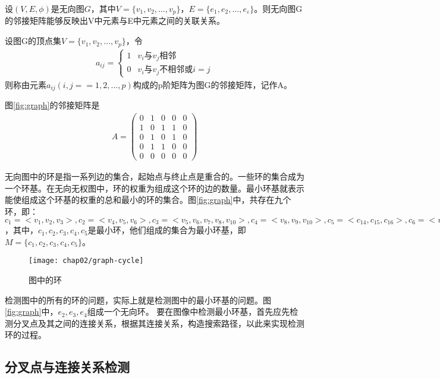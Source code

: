设$(V, E, \phi)$是无向图$G$，其中$V = \{v_1, v_2, \ldots, v_p\}$，$E = \{e_1, e_2, \ldots, e_\varepsilon\}$。则无向图G的邻接矩阵能够反映出V中元素与E中元素之间的关联关系。
\begin{definition}
设图G的顶点集$V = \{v_1, v_2, \ldots, v_p\}$，令
\begin{align}
a_{ij} = \left\{ \begin{array}{ll}
1 & \textrm{$v_i$与$v_j$相邻}\\
0 & \textrm{$v_i$与$v_j$不相邻或$i = j$}
\end{array} \right.
\end{align}
则称由元素$a_{ij} (i, j == 1, 2, \ldots, p)$构成的p阶矩阵为图G的邻接矩阵\cite{wangzhaorui}，记作A。
\end{definition}
图\ref{fig:graph}的邻接矩阵是
\begin{align}
A = \left( \begin{array}{lllll}
0 & 1 & 0 & 0 & 0 \\
1 & 0 & 1 & 1 & 0 \\
0 & 1 & 0 & 1 & 0 \\
0 & 1 & 1 & 0 & 0 \\
0 & 0 & 0 & 0 & 0 
\end{array} \right)
\end{align}

无向图中的环是指一系列边的集合，起始点与终止点是重合的。一些环的集合成为一个环基。在无向无权图中，环的权重为组成这个环的边的数量。最小环基就表示能使组成这个环基的权重的总和最小的环的集合。图\ref{fig:graph}中，共存在九个环，即：$c_1 = < v_1, v_2, v_3>, c_2 = <v_4, v_5, v_6>, c_3 = <v_5, v_6, v_7, v_8, v_{10}>, c_4 = <v_8, v_9, v_{10}>, c_5 = < c_{14}, c_{15}, c_{16}>, c_6 = <v_{10}, v_{11}, v_{12}, v_{13}>, c_7 = <c_4, c_5, v_{10}, v_9, v_8, v_7, v_6>, c_8 = < v_6, v_5, v_{10}, v_9, v_8, v_7>, v_9 = < v_4, v_5, v_{10}, v_9, v_8, v_7, v_6>$，其中，$c_1, c_2, c_3, c_4, c_5$是最小环，他们组成的集合为最小环基，即$M = \{c_1, c_2, c_3, c_4, c_5\}$。
\begin{figure}[H]
\centering
    \centering
    \texttt{[image: chap02/graph-cycle]}\medskip
\caption{图中的环}
\label{fig:graph-cycle}
\end{figure}


检测图中的所有的环的问题，实际上就是检测图中的最小环基的问题。图\ref{fig:graph}中，$e_2, e_3, e_4$组成一个无向环。
要在图像中检测最小环基，首先应先检测分叉点及其之间的连接关系，根据其连接关系，构造搜索路径，以此来实现检测环的过程。

\subsection{分叉点与连接关系检测}
\label{}

